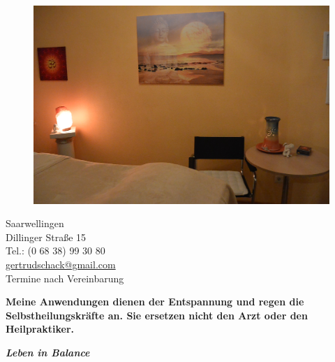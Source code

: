 \documentclass[10pt,foldmark,notumble]{leaflet}
\begin{document}
\begin{figure}[h]
\includegraphics [scale=.12]{Raum_neu.jpg}
\end{figure}


\vspace*{7mm}
\begin{flushleft}
Saarwellingen\\
Dillinger Straße 15\\
Tel.: (0 68 38) 99 30 80\\
\href{mailto:gertrudschack@gmail.com}{gertrudschack@gmail.com} \\
\vspace{2mm}
\large{Termine nach Vereinbarung} %
\end{flushleft}

{\bf Meine Anwendungen dienen der Entspannung und \mbox{regen} die Selbstheilungskräfte an. Sie ersetzen nicht den Arzt oder den Heilpraktiker. }


\newpage

\centerline {\LARGE {\bf \it {Leben in Balance}}}
\end{document}
